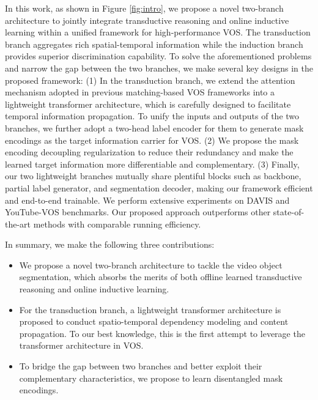 \documentclass[10pt,twocolumn,letterpaper]{article}
\begin{document}
In this work, as shown in Figure \ref{fig:intro}, we propose a novel two-branch architecture to jointly integrate transductive reasoning and online inductive learning within a unified framework for high-performance VOS. 
The transduction branch aggregates rich spatial-temporal information while the induction branch provides superior discrimination capability.
To solve the aforementioned problems and narrow the gap between the two branches, we make several key designs in the proposed framework:
(1) In the transduction branch, we extend the attention mechanism adopted in previous matching-based VOS frameworks \cite{Seoung2019A,Zhang2020A,Seong2020A} into a lightweight transformer \cite{DETR2020A,transformer2017A} architecture, which is carefully designed to facilitate temporal information propagation.
To unify the inputs and outputs of the two branches, we further adopt a two-head label encoder for them to generate mask encodings as the target information carrier for VOS.
(2) We propose the mask encoding decoupling regularization to reduce their redundancy and make the learned target information more differentiable and complementary.
(3) Finally, our two lightweight branches mutually share plentiful blocks such as backbone,  partial label generator, and segmentation decoder, making our framework efficient and end-to-end trainable.
We perform extensive experiments on DAVIS \cite{DAVIS2017} and YouTube-VOS \cite{Xu2018YouTubeVOSAL} benchmarks. Our proposed approach outperforms other state-of-the-art methods with comparable running efficiency.

In summary, we make the following three contributions:
\begin{itemize}[itemsep= 0 pt,topsep = 0 pt, parsep=0 pt]
	\item We propose a novel two-branch architecture to tackle the video object segmentation, which absorbs the merits of both offline learned transductive reasoning and online inductive learning.
	\item For the transduction branch, a lightweight transformer architecture is proposed to conduct spatio-temporal dependency modeling and content propagation.
To our best knowledge, this is the first attempt to leverage the transformer architecture in VOS.
	\item To bridge the gap between two branches and better exploit their complementary characteristics, we propose to learn disentangled mask encodings.
\end{itemize}
\end{document}
